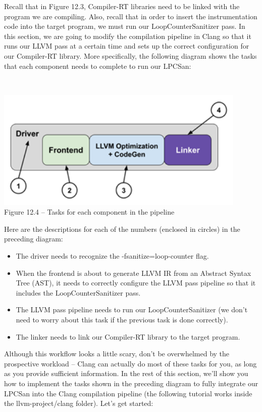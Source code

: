 Recall that in Figure 12.3, Compiler-RT libraries need to be linked with the program we are compiling. Also, recall that in order to insert the instrumentation code into the target program, we must run our LoopCounterSanitizer pass. In this section, we are going to modify the compilation pipeline in Clang so that it runs our LLVM pass at a certain time and sets up the correct configuration for our Compiler-RT library. More specifically, the following diagram shows the tasks that each component needs to complete to run our LPCSan:

\hspace*{\fill} \\ %
\begin{center}
\includegraphics[width=0.9\textwidth]{content/3/chapter12/images/4.png}\\
Figure 12.4 – Tasks for each component in the pipeline
\end{center}

Here are the descriptions for each of the numbers (enclosed in circles) in the preceding diagram:

\begin{itemize}
\item The driver needs to recognize the -fsanitize=loop-counter flag.
\item When the frontend is about to generate LLVM IR from an Abstract Syntax Tree (AST), it needs to correctly configure the LLVM pass pipeline so that it includes the LoopCounterSanitizer pass.
\item The LLVM pass pipeline needs to run our LoopCounterSanitizer (we don't need to worry about this task if the previous task is done correctly).
\item The linker needs to link our Compiler-RT library to the target program.
\end{itemize}

Although this workflow looks a little scary, don't be overwhelmed by the prospective workload – Clang can actually do most of these tasks for you, as long as you provide sufficient information. In the rest of this section, we'll show you how to implement the tasks shown in the preceding diagram to fully integrate our LPCSan into the Clang compilation pipeline (the following tutorial works inside the llvm-project/clang folder). Let's get started:


